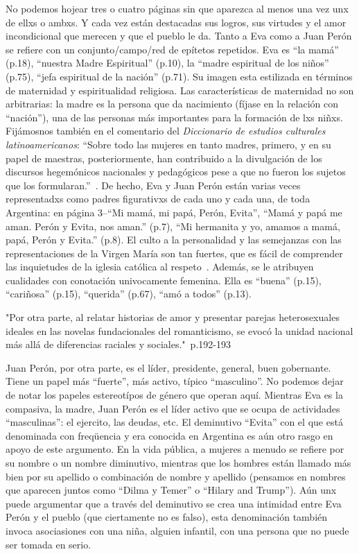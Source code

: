 No podemos hojear tres o cuatro páginas sin que aparezca al menos una vez unx de ellxs o ambxs.
Y cada vez están destacadas sus logros, sus virtudes y el amor incondicional que merecen y que el pueblo le da.
Tanto a Eva como a Juan Perón se refiere con un conjunto/campo/red de epítetos repetidos.
Eva es ``la mamá'' (p.18), ``nuestra Madre Espiritual'' (p.10), la ``madre espiritual de los niños'' (p.75), ``jefa espiritual de la nación'' (p.71).
Su imagen esta estilizada en términos de maternidad y espiritualidad religiosa.
Las características de maternidad no son arbitrarias: la madre es la persona que da nacimiento (fíjase en la relación con ``nación''), una de las personas más importantes para la formación de lxs niñxs.
Fijámosnos también en el comentario del \textit{Diccionario de estudios culturales latinoamericanos}: ``Sobre todo las mujeres en tanto madres, primero, y en su papel de maestras, posteriormente, han contribuido a la divulgación de los discursos hegemónicos nacionales y pedagógicos pese a que no fueron los sujetos que los formularan.''~\autocite[190-191]{SzIr2009}.
De hecho, Eva y Juan Perón están varias veces representadxs como padres figurativxs de cada uno y cada una, de toda Argentina:
en página 3--``Mi mamá, mi papá, Perón, Evita'', ``Mamá y papá me aman. Perón y Evita, nos aman.'' (p.7), ``Mi hermanita y yo, amamos a mamá, papá, Perón y Evita.'' (p.8).
El culto a la personalidad y las semejanzas con las representaciones de la Virgen María son tan fuertes, que es fácil de comprender las inquietudes de la iglesia católica al respeto~\autocite{Chamosa2010}.
Además, se le atribuyen cualidades con conotación univocamente femenina.
Ella es ``buena'' (p.15), ``cariñosa'' (p.15), ``querida'' (p.67), ``amó a todos'' (p.13).

"Por otra parte, al relatar historias de amor y presentar parejas heterosexuales ideales en las novelas fundacionales del romanticismo, se evocó la unidad nacional más allá de diferencias raciales y sociales."~\cite{SzIr2009}{p.192-193}

Juan Perón, por otra parte, es el líder, presidente, general, buen gobernante.
Tiene un papel más ``fuerte'', más activo, típico ``masculino''.
No podemos dejar de notar los papeles estereotípos de género que operan aquí.
Mientras Eva es la compasiva, la madre, Juan Perón es el líder activo que se ocupa de actividades ``masculinas'': el ejercito, las deudas, etc.
El deminutivo ``Evita'' con el que está denominada con freqüencia y era conocida en Argentina es aún otro rasgo en apoyo de este argumento.
En la vida pública, a mujeres a menudo se refiere por su nombre o un nombre diminutivo, mientras que los hombres están llamado más bien por su apellido o combinación de nombre y apellido (pensamos en nombres que aparecen juntos como ``Dilma y Temer'' o ``Hilary and Trump'').
Aún unx puede argumentar que a través del deminutivo se crea una intimidad entre Eva Perón y el pueblo (que ciertamente no es falso),
esta denominación también invoca asociasiones con una niña, alguien infantil, con una persona que no puede ser tomada en serio.

